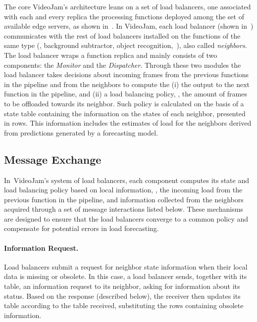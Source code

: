 The core VideoJam's architecture leans on a set of load balancers, one associated with each and every replica the processing functions deployed among the set of available edge servers, as shown in~. In VideoJam, each load balancer (shown in~) communicates with the rest of load balancers installed on the functions of the same type (\eg, background subtractor, object recognition,~\etc), also called \textit{neighbors}. The load balancer wraps a function replica and mainly consists of two components: the \textit{Monitor} and the \textit{Dispatcher}. Through these two modules the load balancer takes decisions about incoming frames from the previous functions in the pipeline and from the neighbors to compute the (i) the output to the next function in the pipeline, and (ii) a load balancing policy, \ie, the amount of frames to be offloaded towards its neighbor. Such policy is calculated on the basis of a state table containing the information on the states of each neighbor, presented in rows. This information includes the estimates of load for the neighbors derived from predictions generated by a forecasting model. 

\subsection{Message Exchange}
In~VideoJam's system of load balancers, each component computes its state and load balancing policy based on local information, \ie, the incoming load from the previous function in the pipeline, and information collected from the neighbors acquired through a set of message interactions listed below. These mechanisms are designed to ensure that the load balancers converge to a common policy and compensate for potential errors in load forecasting.

\paragraph{Information Request.} Load balancers submit a request for neighbor state information when their local data is missing or obsolete. In this case, a load balancer sends, together with its table, an information request to its neighbor, asking for information about its status. Based on the response (described below), the receiver then updates its table according to the table received, substituting the rows containing obsolete information. 

